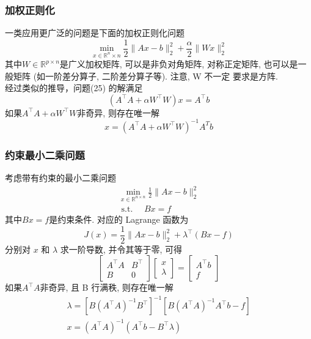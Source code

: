 \documentclass[12pt,a4paper]{article}
\begin{document}
\subsubsection{加权正则化}
一类应用更广泛的问题是下面的加权正则化问题
\begin{equation}
\min _{x \in \mathbb{R}^{n} \times n} \frac{1}{2}\|A x-b\|_{2}^{2}+\frac{\alpha}{2}\|W x\|_{2}^{2}
\end{equation}
其中$W \in \mathbb{R}^{p \times n}$是广义加权矩阵, 可以是非负对角矩阵, 对称正定矩阵, 也可以是一般矩阵 (如一阶差分算子, 二阶差分算子等). 注意, W 不一定 要求是方阵.\\
经过类似的推导，问题(25) 的解满足
$$
\left(A^{\top} A+\alpha W^{\top} W\right) x=A^{\top} b
$$
如果$A^{\top} A+\alpha W^{\top} W$非奇异, 则存在唯一解
$$
x=\left(A^{\top} A+\alpha W^{\top} W\right)^{-1} A^{T} b
$$
\subsubsection{约束最小二乘问题}
考虑带有约束的最小二乘问题
\begin{equation}
\begin{array}{l}{\min _{x \in \mathbb{R}^{n \times n}} \frac{1}{2}\|A x-b\|_{2}^{2}} \\ {\text { s.t. } \quad B x=f}\end{array}
\end{equation}
其中$B x=f$是约束条件. 对应的 Lagrange 函数为
$$
J(x)=\frac{1}{2}\|A x-b\|_{2}^{2}+\lambda^{\top}(B x-f)
$$
分别对 $x$ 和 $\lambda$ 求一阶导数, 并令其等于零, 可得
$$
\left[\begin{array}{cc}{A^{\top} A} & {B^{\top}} \\ {B} & {0}\end{array}\right]\left[\begin{array}{l}{x} \\ {\lambda}\end{array}\right]=\left[\begin{array}{c}{A^{\top} b} \\ {f}\end{array}\right]
$$
如果$A^{\top} A$非奇异, 且 B 行满秩, 则存在唯一解
$$
\begin{array}{l}{\lambda=\left[B\left(A^{\top} A\right)^{-1} B^{\top}\right]^{-1}\left[B\left(A^{\top} A\right)^{-1} A^{\top} b-f\right]} \\ {x=\left(A^{\top} A\right)^{-1}\left(A^{\top} b-B^{\top} \lambda\right)}\end{array}
$$
\end{document}
